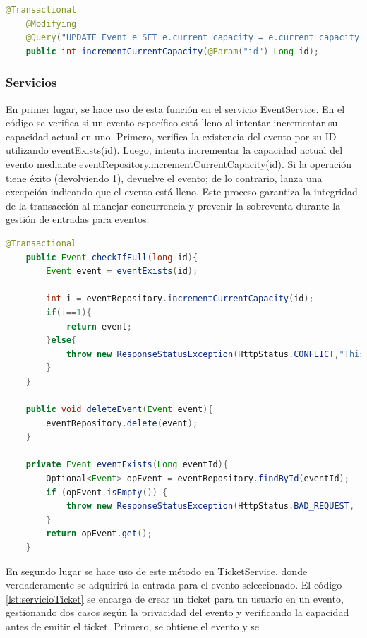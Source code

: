 \myjavastyle
\begin{lstlisting}[language=Java, caption=Función incrementCurrentCapacity, label=lst:jpaconcurrente]
    @Transactional
    @Modifying
    @Query("UPDATE Event e SET e.current_capacity = e.current_capacity + 1 WHERE e.id = :id AND e.current_capacity + 1  <= e.max_capacity")
    public int incrementCurrentCapacity(@Param("id") Long id);
\end{lstlisting}

\subsubsection*{Servicios}
En primer lugar, se hace uso de esta función en el servicio EventService. En el código se verifica si un evento específico está lleno al intentar incrementar su capacidad 
actual en uno. Primero, verifica la existencia del evento por su ID utilizando eventExists(id). Luego, intenta incrementar la capacidad actual del evento mediante 
eventRepository.incrementCurrentCapacity(id). Si la operación tiene éxito (devolviendo 1), devuelve el evento; de lo contrario, lanza una excepción indicando que el 
evento está lleno. Este proceso garantiza la integridad de la transacción al manejar concurrencia y prevenir la sobreventa durante la gestión de entradas para eventos.
\myjavastyle
\begin{lstlisting}[language=Java, caption=Función incrementCurrentCapacity, label=lst:servicioEvento]
    @Transactional
    public Event checkIfFull(long id){
        Event event = eventExists(id);

        int i = eventRepository.incrementCurrentCapacity(id);
        if(i==1){
            return event;
        }else{
            throw new ResponseStatusException(HttpStatus.CONFLICT,"This event is full");
        }
    }

    public void deleteEvent(Event event){
        eventRepository.delete(event);
    }

    private Event eventExists(Long eventId){
        Optional<Event> opEvent = eventRepository.findById(eventId);
        if (opEvent.isEmpty()) {
            throw new ResponseStatusException(HttpStatus.BAD_REQUEST, "Event not longer exist");
        }
        return opEvent.get();
    }
\end{lstlisting}
En segundo lugar se hace uso de este método en TicketService, donde verdaderamente se adquirirá la entrada para el evento seleccionado. El código \ref{lst:servicioTicket} se encarga de crear un ticket
para un usuario en un evento, gestionando dos casos según la privacidad del evento y verificando la capacidad antes de emitir el ticket. Primero, se obtiene el evento y se
